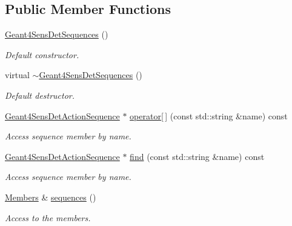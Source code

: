 \subsection*{Public Member Functions}
\begin{DoxyCompactItemize}
\item 
\hyperlink{class_d_d4hep_1_1_simulation_1_1_geant4_sens_det_sequences_a5a78304dcb1472bf7a7de1b4305a264f}{Geant4\+Sens\+Det\+Sequences} ()
\begin{DoxyCompactList}\small\item\em Default constructor. \end{DoxyCompactList}\item 
virtual \hyperlink{class_d_d4hep_1_1_simulation_1_1_geant4_sens_det_sequences_a6f27557827175da8f038b84959cb109d}{$\sim$\+Geant4\+Sens\+Det\+Sequences} ()
\begin{DoxyCompactList}\small\item\em Default destructor. \end{DoxyCompactList}\item 
\hyperlink{class_d_d4hep_1_1_simulation_1_1_geant4_sens_det_action_sequence}{Geant4\+Sens\+Det\+Action\+Sequence} $\ast$ \hyperlink{class_d_d4hep_1_1_simulation_1_1_geant4_sens_det_sequences_ad3d42dda04a3f8ae499fcb098d818098}{operator\mbox{[}$\,$\mbox{]}} (const std\+::string \&name) const
\begin{DoxyCompactList}\small\item\em Access sequence member by name. \end{DoxyCompactList}\item 
\hyperlink{class_d_d4hep_1_1_simulation_1_1_geant4_sens_det_action_sequence}{Geant4\+Sens\+Det\+Action\+Sequence} $\ast$ \hyperlink{class_d_d4hep_1_1_simulation_1_1_geant4_sens_det_sequences_adee9e588585b3a8079dc40b1fd171b3c}{find} (const std\+::string \&name) const
\begin{DoxyCompactList}\small\item\em Access sequence member by name. \end{DoxyCompactList}\item 
\hyperlink{class_d_d4hep_1_1_simulation_1_1_geant4_sens_det_sequences_a2266138a517dd9b784af9234312fdd12}{Members} \& \hyperlink{class_d_d4hep_1_1_simulation_1_1_geant4_sens_det_sequences_a40e7646be1758328d5bf58213b320bf9}{sequences} ()
\begin{DoxyCompactList}\small\item\em Access to the members. \end{DoxyCompactList}\item 

\end{DoxyCompactItemize}
